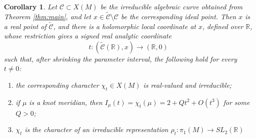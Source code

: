 \documentclass{article}
\theoremstyle{plain}
\theoremstyle{definition}
\theoremstyle{plain}
\theoremstyle{plain}
\newtheorem{corollary}[theorem]{Corollary}
\theoremstyle{plain}
\theoremstyle{remark}
\theoremstyle{remark}
\theoremstyle{plain}
\theoremstyle{plain}
\newcounter{main}
\theoremstyle{plain}
\theoremstyle{plain}
\begin{document}
\begin{corollary}\label{cor:realbranches}
Let $\mathcal C\subset X(M)$ be the irreducible algebraic curve obtained from Theorem \ref{thm:main}, and let $x\in\widetilde{\mathcal C}\setminus\mathcal C$ be the corresponding ideal point. Then $x$ is a real point of $\widetilde{\mathcal C}$, and there is a holomorphic local coordinate at $x$, defined over $\mathbb R$, whose restriction gives a signed real analytic coordinate
\begin{equation*}
	t:(\widetilde{\mathcal C}(\mathbb R),x)\longrightarrow(\mathbb R,0)
\end{equation*}
such that, after shrinking the parameter interval, the following hold for every $t\neq0$:
\begin{enumerate}
	\item the corresponding character $\chi_t\in X(M)$ is real-valued and irreducible;
	\item if $\mu$ is a knot meridian, then $I_\mu(t) = \chi_t(\mu) = 2+Qt^2+O(t^3)$ for some $Q>0$;
	\item $\chi_t$ is the character of an irreducible representation $\rho_t:\pi_1(M)\longrightarrow SL_2(\mathbb R)$
\end{enumerate}
\end{corollary}
\end{document}
